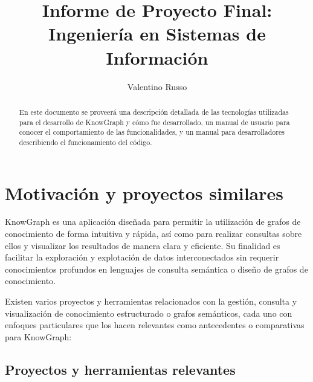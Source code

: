 \documentclass{article}
\title{Informe de Proyecto Final:
Ingeniería en Sistemas de Información}
\author{Valentino Russo}
\begin{document}
\maketitle

\begin{abstract}
En este documento se proveerá una descripción detallada de las tecnologías utilizadas para el desarrollo de KnowGraph y cómo fue desarrollado, un manual de usuario para conocer el comportamiento de las funcionalidades, y un manual para desarrolladores describiendo el funcionamiento del código.
\end{abstract}
\tableofcontents

\section{Motivación y proyectos similares}

KnowGraph es una aplicación diseñada para permitir la utilización de grafos de conocimiento de forma intuitiva y rápida, así como para realizar consultas sobre ellos y visualizar los resultados de manera clara y eficiente. Su finalidad es facilitar la exploración y explotación de datos interconectados sin requerir conocimientos profundos en lenguajes de consulta semántica o diseño de grafos de conocimiento.

Existen varios proyectos y herramientas relacionados con la gestión, consulta y visualización de conocimiento estructurado o grafos semánticos, cada uno con enfoques particulares que los hacen relevantes como antecedentes o comparativas para KnowGraph:

\subsection{Proyectos y herramientas relevantes}
\end{document}
